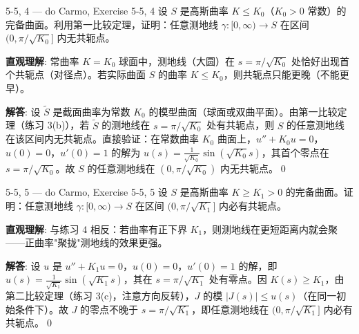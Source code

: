 \begin{exercise}{5-5, 4 — do Carmo, Exercise 5-5, 4}
设 $S$ 是高斯曲率 $K \leq K_0$（$K_0>0$ 常数）的完备曲面。利用第一比较定理，证明：任意测地线 $\gamma: [0, \infty) \to S$ 在区间 $(0,\pi/\sqrt{K_0}]$ 内无共轭点。
\end{exercise}
\begin{solution}
\textbf{直观理解}: 常曲率 $K=K_0$ 球面中，测地线（大圆）在 $s=\pi/\sqrt{K_0}$ 处恰好出现首个共轭点（对径点）。若实际曲面 $S$ 的曲率 $K\leq K_0$，则共轭点只能更晚（不能更早）。

\textbf{解答}: 设 $\tilde{S}$ 是截面曲率为常数 $K_0$ 的模型曲面（球面或双曲平面）。由第一比较定理（练习 3(b)），若 $\tilde{S}$ 的测地线在 $s=\pi/\sqrt{K_0}$ 处有共轭点，则 $S$ 的任意测地线在该区间内无共轭点。直接验证：在常数曲率 $K_0$ 曲面上，$u''+K_0u=0$，$u(0)=0$，$u'(0)=1$ 的解为 $u(s)=\frac{1}{\sqrt{K_0}}\sin(\sqrt{K_0}s)$，其首个零点在 $s=\pi/\sqrt{K_0}$。故 $S$ 的任意测地线在 $(0,\pi/\sqrt{K_0})$ 内无共轭点。\qed
\end{solution}

\begin{exercise}{5-5, 5 — do Carmo, Exercise 5-5, 5}
设 $S$ 是高斯曲率 $K \geq K_1 > 0$ 的完备曲面。证明：任意测地线 $\gamma: [0, \infty) \to S$ 在区间 $(0,\pi/\sqrt{K_1}]$ 内必有共轭点。
\end{exercise}
\begin{solution}
\textbf{直观理解}: 与练习 4 相反：若曲率有正下界 $K_1$，则测地线在更短距离内就会聚——正曲率"聚拢"测地线的效果更强。

\textbf{解答}: 设 $u$ 是 $u''+K_1u=0$，$u(0)=0$，$u'(0)=1$ 的解，即 $u(s)=\frac{1}{\sqrt{K_1}}\sin(\sqrt{K_1}s)$，其在 $s=\pi/\sqrt{K_1}$ 处有零点。因 $K(s)\geq K_1$，由第二比较定理（练习 3(c)，注意方向反转），$J$ 的模 $|J(s)|\leq u(s)$（在同一初始条件下）。故 $J$ 的零点不晚于 $s=\pi/\sqrt{K_1}$，即任意测地线在 $(0,\pi/\sqrt{K_1}]$ 内必有共轭点。\qed
\end{solution}

